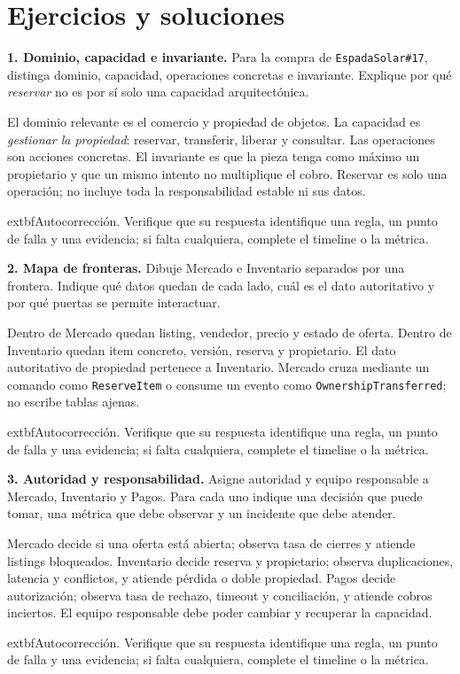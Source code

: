 \documentclass[variant=guiaresuelta,cover=institutional,mode=screen]{ua-engineering-v6-article}
\begin{document}
\section{Ejercicios y soluciones}
\begin{uaexercise}
\textbf{1. Dominio, capacidad e invariante.} Para la compra de \texttt{EspadaSolar\#17}, distinga dominio, capacidad, operaciones concretas e invariante. Explique por qué \emph{reservar} no es por sí solo una capacidad arquitectónica.
\end{uaexercise}
\begin{uaanswer}
El dominio relevante es el comercio y propiedad de objetos. La capacidad es \emph{gestionar la propiedad}: reservar, transferir, liberar y consultar. Las operaciones son acciones concretas. El invariante es que la pieza tenga como máximo un propietario y que un mismo intento no multiplique el cobro. Reservar es solo una operación; no incluye toda la responsabilidad estable ni sus datos.
\par\smallskip	extbf{Autocorrección.} Verifique que su respuesta identifique una regla, un punto de falla y una evidencia; si falta cualquiera, complete el timeline o la métrica.
\end{uaanswer}
\begin{uaexercise}
\textbf{2. Mapa de fronteras.} Dibuje Mercado e Inventario separados por una frontera. Indique qué datos quedan de cada lado, cuál es el dato autoritativo y por qué puertas se permite interactuar.
\end{uaexercise}
\begin{uaanswer}
Dentro de Mercado quedan listing, vendedor, precio y estado de oferta. Dentro de Inventario quedan item concreto, versión, reserva y propietario. El dato autoritativo de propiedad pertenece a Inventario. Mercado cruza mediante un comando como \texttt{ReserveItem} o consume un evento como \texttt{OwnershipTransferred}; no escribe tablas ajenas.
\par\smallskip	extbf{Autocorrección.} Verifique que su respuesta identifique una regla, un punto de falla y una evidencia; si falta cualquiera, complete el timeline o la métrica.
\end{uaanswer}
\begin{uaexercise}
\textbf{3. Autoridad y responsabilidad.} Asigne autoridad y equipo responsable a Mercado, Inventario y Pagos. Para cada uno indique una decisión que puede tomar, una métrica que debe observar y un incidente que debe atender.
\end{uaexercise}
\begin{uaanswer}
Mercado decide si una oferta está abierta; observa tasa de cierres y atiende listings bloqueados. Inventario decide reserva y propietario; observa duplicaciones, latencia y conflictos, y atiende pérdida o doble propiedad. Pagos decide autorización; observa tasa de rechazo, timeout y conciliación, y atiende cobros inciertos. El equipo responsable debe poder cambiar y recuperar la capacidad.
\par\smallskip	extbf{Autocorrección.} Verifique que su respuesta identifique una regla, un punto de falla y una evidencia; si falta cualquiera, complete el timeline o la métrica.
\end{uaanswer}
\end{document}
